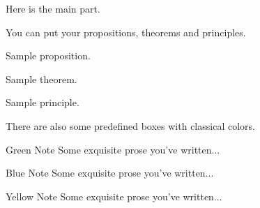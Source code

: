Here is the main part.

You can put your propositions, theorems and principles.
\begin{proposition}
    Sample proposition.
\end{proposition}

\begin{theorem}
    Sample theorem.
\end{theorem}

\begin{principle}
    Sample principle.
\end{principle}

There are also some predefined boxes with classical colors.
\begin{greenbox}{Green Note}
    Some exquisite prose you've written...
\end{greenbox}

\begin{bluebox}{Blue Note}
    Some exquisite prose you've written...
\end{bluebox}

\begin{yellowbox}{Yellow Note}
    Some exquisite prose you've written...
\end{yellowbox}